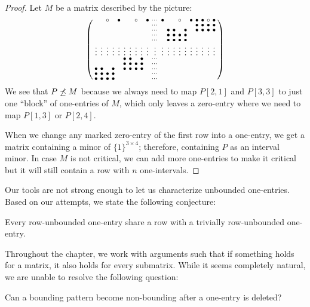 \begin{proof} Let $M$ be a matrix described by the picture:
$$\left(\begin{smallmatrix}	 & &\circ& &\bullet& & &\circ& &\bullet&\cdots&\bullet& & &\circ& &\bullet&\bullet&\bullet&\circ&\bullet\\
		 & & & & & & & & & &\cdots& & & & & & &\bullet&\bullet&\bullet&\bullet\\
		 & & & & & & & & & &\cdots& &\bullet&\bullet& &\bullet& &\bullet&\bullet&\bullet&\bullet\\
		 & & & & & & & & & &\cdots& &\bullet&\bullet&\bullet&\bullet& & & & & \\
		 & & & & & & & & & &\cdots& &\bullet&\bullet&\bullet&\bullet& & & & & \\
		\vdots&\vdots&\vdots&\vdots&\vdots&\vdots&\vdots&\vdots&\vdots&\vdots&\vdots&\vdots&\vdots&\vdots&\vdots&\vdots&\vdots&\vdots&\vdots&\vdots&\vdots\\
		 & & & & &\bullet&\bullet& &\bullet& &\cdots& & & & & & & \\
		 & & & & &\bullet&\bullet&\bullet&\bullet& &\cdots& & & & & & & \\
		\bullet&\bullet& &\bullet& &\bullet&\bullet&\bullet&\bullet& &\cdots& & & & & & & \\
		\bullet&\bullet&\bullet&\bullet& & & & & & &\cdots& & & & & & & \\
		\bullet&\bullet&\bullet&\bullet& & & & & & &\cdots& & & & & & & \\
		 \end{smallmatrix}\right)$$
We see that $P\not\preceq M$ because we always need to map $P[2,1]$ and $P[3,3]$ to just one ``block'' of one-entries of $M$, which only leaves a zero-entry where we need to map $P[1,3]$ or $P[2,4]$.

When we change any marked zero-entry of the first row into a one-entry, we get a matrix containing a minor of $\{1\}^{3\times4}$; therefore, containing $P$ as an interval minor. In case $M$ is not critical, we can add more one-entries to make it critical but it will still contain a row with $n$ one-intervals.
\end{proof}
Our tools are not strong enough to let us characterize unbounded one-entries. Based on our attempts, we state the following conjecture:
\begin{conj}
Every row-unbounded one-entry share a row with a trivially row-unbounded one-entry.
\end{conj}

Throughout the chapter, we work with arguments such that if something holds for a matrix, it also holds for every submatrix. While it seems completely natural, we are unable to resolve the following question:
\begin{ques}
Can a bounding pattern become non-bounding after a one-entry is deleted?
\end{ques}

